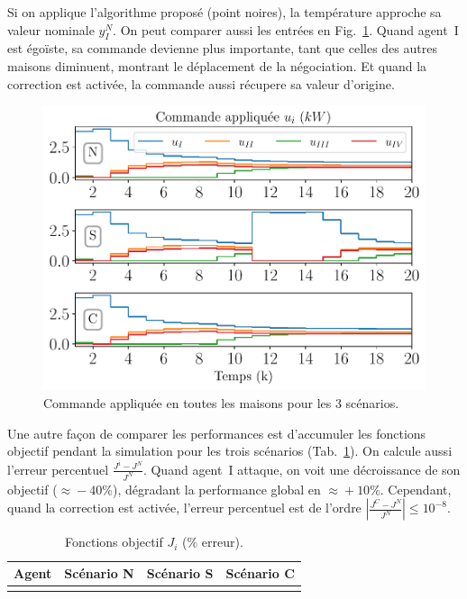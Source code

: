\documentclass[../main.tex]{subfiles}
\begin{document}
Si on applique l'algorithme proposé (point noires), la température approche sa valeur nominale $y_{I}^{N}$.
On peut comparer aussi les entrées en Fig.~\ref{fig:control_3Scenarios_fr}.
Quand agent~I est égoïste, sa commande devienne plus importante, tant que celles des autres maisons diminuent,
montrant le déplacement de la négociation.
Et quand la correction est activée, la commande aussi récupere sa valeur d'origine.
\begin{figure}[H]
  \centering
 \includegraphics[width=.7\textwidth,trim=0 .1cm 0 .3cm,clip]{../img/resilient_ineq/control_fr.pdf}
  \caption{Commande appliquée en toutes les maisons pour les 3 scénarios.}\label{fig:control_3Scenarios_fr}
\end{figure}

Une autre façon de comparer les performances est d'accumuler les fonctions objectif pendant la simulation pour les trois scénarios (Tab.~\ref{tab:costsGlobalLocal_fr}).
On calcule aussi l'erreur percentuel ${\frac{J^{i}-J^{N}}{J^{N}}}$.
Quand agent~I attaque, on voit une décroissance de son objectif ($\approx\!-40\%$), dégradant la performance global en $\approx\!+10\%$.
Cependant, quand la correction est activée, l'erreur percentuel est de l'ordre ${|\frac{J^{C}-J^{N}}{J^{N}}|\leq10^{-8}}$.

\begin{table}[H]
  \centering
  \caption{Fonctions objectif $J_{i}$ (\% erreur).}\label{tab:costsGlobalLocal_fr}
  \begin{tabular}[t]{cccc}
    \toprule
    Agent  & Scénario N& Scénario S & Scénario C\\
    \midrule
    \\
    \bottomrule
  \end{tabular}
\end{table}
\end{document}
